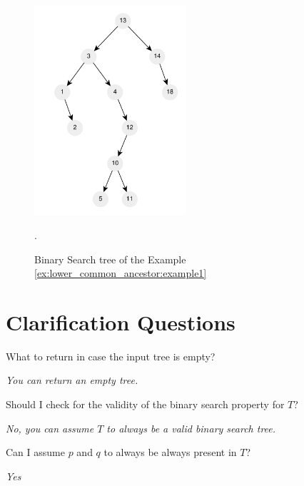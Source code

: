 \begin{figure}
	\centering
	\includegraphics[width=0.5\textwidth]{sources/lowest_common_ancestor/images/example1}
	\caption[Sample short cpation]{Binary Search tree of the Example
	\ref{ex:lower_common_ancestor:example1}}.
	\label{fig:lowest_common_ancestor:example1}
\end{figure}

\section{Clarification Questions}

\begin{QandA}
	\item \begin{questionitem} \begin{question} What to return in case the input tree is empty?  \end{question} 	 
    \begin{answered}
		\textit{You can return an empty tree.}
	\end{answered} \end{questionitem}


	\item \begin{questionitem} \begin{question} Should I check for the validity of the binary search property for $T$?  \end{question} 	 
    \begin{answered}
		\textit{No, you can assume $T$ to always be a valid binary search tree.}
	\end{answered} \end{questionitem}

	\item \begin{questionitem} \begin{question} Can I assume $p$ and $q$ to always be always present in $T$?  \end{question} 	 
    \begin{answered}
		\textit{Yes}
	\end{answered} \end{questionitem}

	
\end{QandA}

